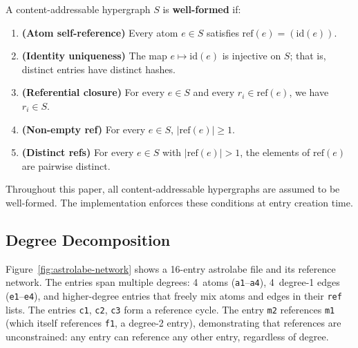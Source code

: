 \begin{definition}
\label{def:wellformed}
A content-addressable hypergraph $S$ is \textbf{well-formed} if:
\begin{enumerate}
  \item \textbf{(Atom self-reference)} Every atom $e \in S$ satisfies $\mathrm{ref}(e) = (\mathrm{id}(e))$.
  \item \textbf{(Identity uniqueness)} The map $e \mapsto \mathrm{id}(e)$ is injective on $S$; that is, distinct entries have distinct hashes.
  \item \textbf{(Referential closure)} For every $e \in S$ and every $r_i \in \mathrm{ref}(e)$, we have $r_i \in S$.
  \item \textbf{(Non-empty ref)} For every $e \in S$, $|\mathrm{ref}(e)| \geq 1$.
  \item \textbf{(Distinct refs)} For every $e \in S$ with $|\mathrm{ref}(e)| > 1$, the elements of $\mathrm{ref}(e)$ are pairwise distinct.
\end{enumerate}
\end{definition}

\noindent Throughout this paper, all content-addressable hypergraphs are assumed to be well-formed. The implementation enforces these conditions at entry creation time.

\subsection{Degree Decomposition}

Figure~\ref{fig:astrolabe-network} shows a 16-entry astrolabe file and its reference network. The entries span multiple degrees: 4~atoms (\texttt{a1}--\texttt{a4}), 4~degree-1 edges (\texttt{e1}--\texttt{e4}), and higher-degree entries that freely mix atoms and edges in their \texttt{ref} lists. The entries \texttt{c1}, \texttt{c2}, \texttt{c3} form a reference cycle. The entry \texttt{m2} references \texttt{m1} (which itself references \texttt{f1}, a degree-2 entry), demonstrating that references are unconstrained: any entry can reference any other entry, regardless of degree.

